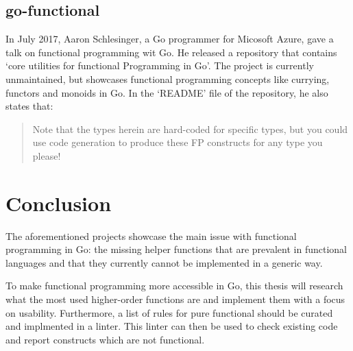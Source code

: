 \subsection{go-functional}

In July 2017, Aaron Schlesinger, a Go programmer for Micosoft Azure, gave a talk on functional programming wit Go.
He released a repository\autocite{go-functional} that contains `core utilities for functional Programming in Go'.
The project is currently unmaintained, but showcases functional programming concepts like currying, functors and
monoids in Go.
In the `README' file of the repository, he also states that:
\begin{quote}
    Note that the types herein are hard-coded for specific types, but you could
    use code generation to produce these FP constructs for any type you please!
    \autocite{go-functional-readme}
\end{quote}

\section{Conclusion}

The aforementioned projects showcase the main issue with functional programming in Go: the missing
helper functions that are prevalent in functional languages and that they currently cannot be implemented
in a generic way.

To make functional programming more accessible in Go, this thesis will research what the most used
higher-order functions are and implement them with a focus on usability.
Furthermore, a list of rules for pure functional should be curated and implmented in a linter. This
linter can then be used to check existing code and report constructs which are not functional.
